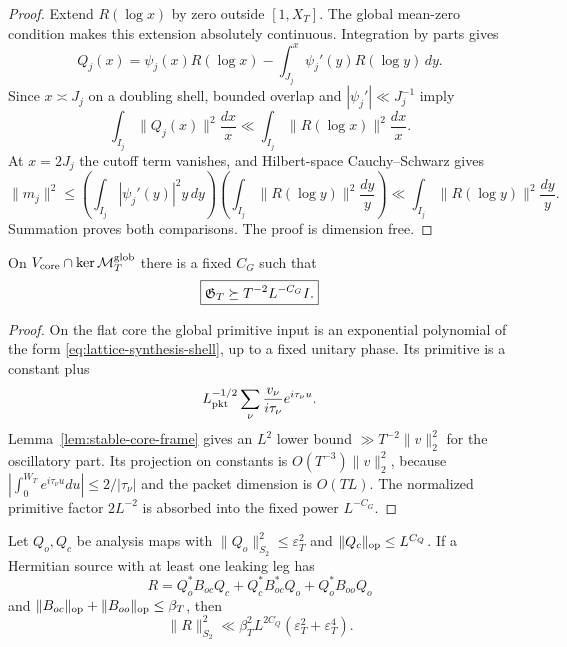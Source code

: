 \begin{proof}
Extend $R(\log x)$ by zero outside $[1,X_T]$.  The global mean-zero condition
makes this extension absolutely continuous.  Integration by parts gives
\[
Q_j(x)=\psi_j(x)R(\log x)
-\int_{J_j}^x\psi_j'(y)R(\log y)\,dy.
\]
Since $x\asymp J_j$ on a doubling shell, bounded overlap and
$|\psi_j'|\ll J_j^{-1}$ imply
\[
\int_{I_j}\|Q_j(x)\|^2\frac{dx}{x}
\ll\int_{I_j}\|R(\log x)\|^2\frac{dx}{x}.
\]
At $x=2J_j$ the cutoff term vanishes, and Hilbert-space Cauchy--Schwarz gives
\[
 \|m_j\|^2\le
 \left(\int_{I_j}|\psi_j'(y)|^2y\,dy\right)
 \left(\int_{I_j}\|R(\log y)\|^2\frac{dy}{y}\right)
 \ll\int_{I_j}\|R(\log y)\|^2\frac{dy}{y}.
\]
Summation proves both comparisons.  The proof is dimension free.
\end{proof}

\begin{lemma}
\label{lem:core-reference-floor}
On $V_{\rm core}\cap\ker\mathcal M_T^{\rm glob}$ there is a fixed $C_G$ such
that
\begin{equation}
\boxed{\mathfrak G_T\succeq T^{-2}L^{-C_G}I.}
\label{eq:core-reference-floor}
\end{equation}
\end{lemma}

\begin{proof}
On the flat core the global primitive input is an exponential polynomial of
the form \eqref{eq:lattice-synthesis-shell}, up to a fixed unitary phase.  Its
primitive is a constant plus
\[
L_{\rm pkt}^{-1/2}\sum_\nu
\frac{v_\nu}{i\tau_\nu}e^{i\tau_\nu u}.
\]
Lemma~\ref{lem:stable-core-frame} gives an $L^2$ lower bound
$\gg T^{-2}\|v\|_2^2$ for the oscillatory part.  Its projection on constants
is $O(T^{-3})\|v\|_2^2$, because
$|\int_0^{W_T}e^{i\tau_\nu u}du|\le2/|\tau_\nu|$ and the packet dimension is
$O(TL)$.  The normalized primitive factor $2L^{-2}$ is absorbed into the fixed
power $L^{-C_G}$.
\end{proof}

\begin{lemma}
\label{lem:one-leaking-leg-HS}
Let $Q_o,Q_c$ be analysis maps with
$\|Q_o\|_{S_2}^2\le\varepsilon_T^2$ and
$\|Q_c\|_{\operatorname{op}}\le L^{C_Q}$.  If a Hermitian source with at least one leaking
leg has
\[
R=Q_o^*B_{oc}Q_c+Q_c^*B_{oc}^*Q_o+Q_o^*B_{oo}Q_o
\]
and
$\|B_{oc}\|_{\operatorname{op}}+\|B_{oo}\|_{\operatorname{op}}\le\beta_T$, then
\begin{equation}
\boxed{
\|R\|_{S_2}^2
\ll\beta_T^2L^{2C_Q}(\varepsilon_T^2+\varepsilon_T^4).
}
\label{eq:one-leaking-leg-HS}
\end{equation}
\end{lemma}

